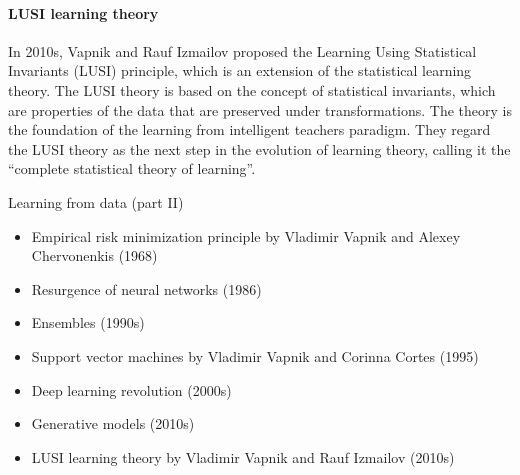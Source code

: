 \paragraph{LUSI learning theory}

In 2010s, Vapnik and Rauf Izmailov proposed the Learning Using Statistical Invariants
(LUSI) principle, which is an extension of the statistical learning theory.  The LUSI
theory is based on the concept of statistical invariants, which are properties of
the data that are preserved under transformations.  The theory is the foundation of the
learning from intelligent teachers paradigm.  They regard the LUSI theory as the
next step in the evolution of learning theory, calling it the ``complete statistical
theory of learning''.

\begin{slidebox}{Learning from data (part II)}{}
  \begin{itemize}
    \item Empirical risk minimization principle by Vladimir Vapnik and Alexey Chervonenkis (1968)
    \item Resurgence of neural networks (1986)
    \item Ensembles (1990s)
    \item Support vector machines by Vladimir Vapnik and Corinna Cortes (1995)
    \item Deep learning revolution (2000s)
    \item Generative models (2010s)
    \item LUSI learning theory by Vladimir Vapnik and Rauf Izmailov (2010s)
  \end{itemize}
\end{slidebox}
